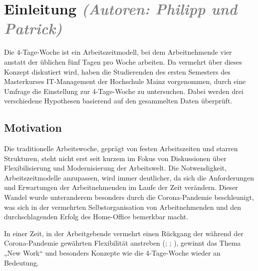 \chapter{Einleitung \textit{\textcolor{gray}{(Autoren: Philipp und Patrick)}} }


Die 4-Tage-Woche ist ein Arbeitszeitmodell, bei dem Arbeitnehmende vier anstatt der üblichen fünf Tagen 
pro Woche arbeiten. Da vermehrt über dieses Konzept diskutiert wird, haben die Studierenden des ersten 
Semesters des Masterkurses IT-Management der Hochschule Mainz vorgenommen, durch eine Umfrage die Einstellung
zur 4-Tage-Woche zu untersuchen. Dabei werden drei verschiedene Hypothesen basierend auf den gesammelten Daten
überprüft.

\section{Motivation}

Die traditionelle Arbeitswoche, geprägt von festen Arbeitszeiten und starren Strukturen, steht nicht erst 
seit kurzem im Fokus von Diskussionen über Flexibilisierung und Modernisierung der Arbeitswelt. 
Die Notwendigkeit, Arbeitszeitmodelle anzupassen, wird immer deutlicher, da sich 
die Anforderungen und Erwartungen der Arbeitnehmenden im Laufe der Zeit verändern. 
Dieser Wandel wurde unteranderem besonders durch die Corona-Pandemie beschleunigt, was sich 
in der vermehrten Selbstorganisation von Arbeitnehmenden und den 
durchschlagenden Erfolg des Home-Office bemerkbar macht. \parencite[vgl.][S. 73]{haide_arbeitswelt_2022}

In einer Zeit, in der Arbeitgebende vermehrt einen Rückgang der während der Corona-Pandemie gewährten 
Flexibilität anstreben (\cite{elias_googles_2023}; \cite{lee_apple_2022}; \cite{vanian_meta_2023}), 
gewinnt das Thema „New Work“ und besonders Konzepte wie die 4-Tage-Woche wieder an Bedeutung.
\parencite[vgl.][S. 10]{onlyfy_wechselwilligkeitsstudie_2023}

